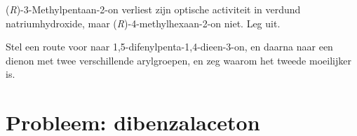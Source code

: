 \begin{exercise}[$\star\star\star$]\label{exo:b2:enolates-aldol:11}
(\textit{R})-3-Methylpentaan-2-on verliest zijn optische activiteit in verdund natriumhydroxide, maar
(\textit{R})-4-methylhexaan-2-on niet. Leg uit.
\end{exercise}

\begin{exercise}[$\star\star\star$]\label{exo:b2:enolates-aldol:12}
Stel een route voor naar 1,5-difenylpenta-1,4-dieen-3-on, en daarna naar een dienon met twee verschillende arylgroepen,
en zeg waarom het tweede moeilijker is.
\end{exercise}

\section{Probleem: dibenzalaceton}

